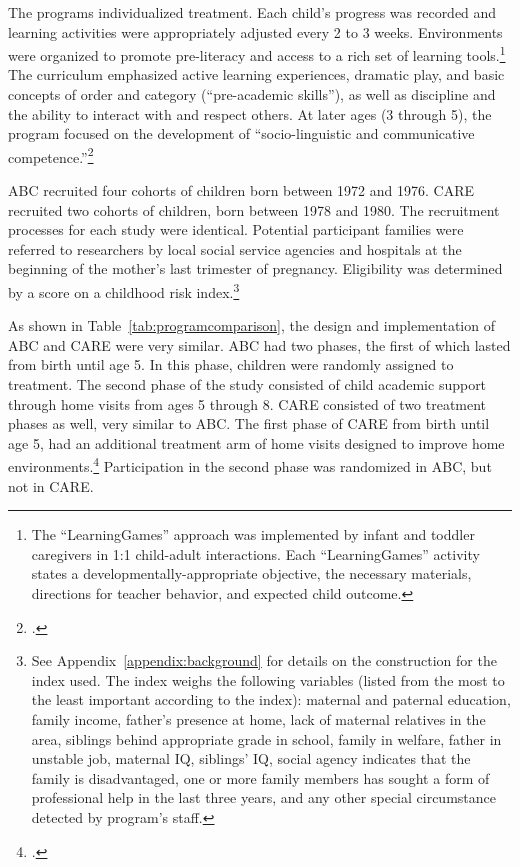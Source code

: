 The programs individualized treatment. Each child's progress was recorded and learning activities were appropriately adjusted every 2 to 3 weeks. Environments were organized to promote pre-literacy and access to a rich set of learning tools.\footnote{The ``LearningGames'' approach was implemented by infant and toddler caregivers in 1:1 child-adult interactions. Each ``LearningGames'' activity states a developmentally-appropriate objective, the necessary materials, directions for teacher behavior, and expected child outcome.} The curriculum emphasized active learning experiences, dramatic play, and basic concepts of order and category (``pre-academic skills''), as well as discipline and the ability to interact with and respect others.  At later ages (3 through 5), the program focused on the development of ``socio-linguistic and communicative competence.''\footnote{\citet{Ramey-et-al_1977_Intro-to-ABC, Haskins_1985_CD, Ramey_1981_Modification, Ramey_Campbell_1979_SR, Ramey_Smith_1977_AJMD, Ramey_McGinness_etal_1982_Abecedarianapproach, Sparling_Lewis_1979_BOOKLearninggamesFirstThree,Sparling_Lewis_1984_BOOKLearningGamesThreesFours}.}

ABC recruited four cohorts of children born between 1972 and 1976. CARE recruited two cohorts of children, born between 1978 and 1980. The recruitment processes for each study were identical. Potential participant families were referred to researchers by local social service agencies and hospitals at the beginning of the mother's last trimester of pregnancy. Eligibility was determined by a score on a childhood risk index.\footnote{See Appendix~\ref{appendix:background} for details on the construction for the index used. The index weighs the following variables (listed from the most to the least important according to the index): maternal and paternal education, family income, father's presence at home, lack of maternal relatives in the area, siblings behind appropriate grade in school, family in welfare, father in unstable job, maternal IQ, siblings' IQ, social agency indicates that the family is disadvantaged, one or more family members has sought a form of professional help in the last three years, and any other special circumstance detected by program's staff.}

As shown in Table~\ref{tab:programcomparison}, the design and implementation of ABC and CARE were very similar. ABC had two phases, the first of which lasted from birth until age 5. In this phase, children were randomly assigned to treatment. The second phase of the study consisted of child academic support through home visits from ages 5 through 8. CARE consisted of two treatment phases as well, very similar to ABC. The first phase of CARE from birth until age 5, had an additional treatment arm of home visits designed to improve home environments.\footnote{\citet{Wasik_Ramey_etal_1990_CD}.} Participation in the second phase was randomized in ABC, but not in CARE.

